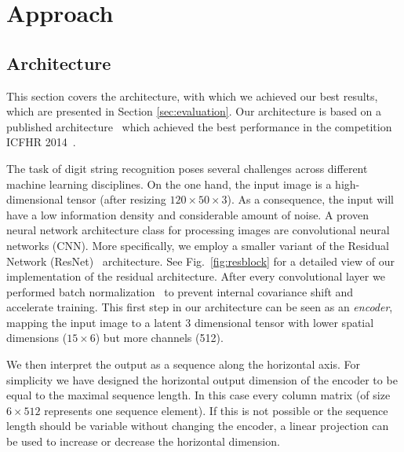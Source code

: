 \section{Approach}\label{sec:approach}

\subsection{Architecture}\label{subsec:architecture}
This section covers the architecture, with which we achieved our best results, which are presented in Section \ref{sec:evaluation}. Our architecture is based on a published architecture~\cite{CTC} which achieved the best performance in the competition ICFHR 2014~\cite{icfhr_competition}.

The task of digit string recognition poses several challenges across different machine learning disciplines.
On the one hand, the input image is a high-dimensional tensor (after resizing $120\times50\times3$).
As a consequence, the input will have a low information density and considerable amount of noise.
A proven neural network architecture class for processing images are convolutional neural networks (CNN).
More specifically, we employ a smaller variant of the Residual Network (ResNet)~\cite{ResNet} architecture.
See Fig.~\ref{fig:resblock} for a detailed view of our implementation of the residual architecture.
After every convolutional layer we performed batch normalization~\cite{batchnorm} to prevent internal covariance shift and accelerate training.
This first step in our architecture can be seen as an \emph{encoder}, mapping the input image to a latent 3 dimensional tensor with lower spatial dimensions ($15 \times 6$) but more channels (512).

We then interpret the output as a sequence along the horizontal axis.
For simplicity we have designed the horizontal output dimension of the encoder to be equal to the maximal sequence length.
In this case every column matrix (of size $6 \times 512$ represents one sequence element).
If this is not possible or the sequence length should be variable without changing the encoder, a linear projection can be used to increase or decrease the horizontal dimension.


